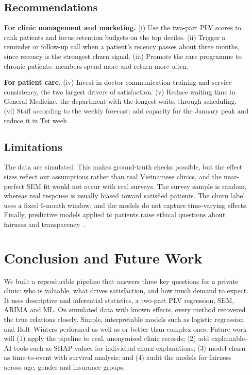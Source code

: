 \documentclass[conference]{IEEEtran}
\begin{document}
\subsection{Recommendations}
\textbf{For clinic management and marketing.} (i) Use the two-part PLV scores to rank patients and focus retention budgets on the top deciles. (ii) Trigger a reminder or follow-up call when a patient's recency passes about three months, since recency is the strongest churn signal. (iii) Promote the care programme to chronic patients: members spend more and return more often.

\textbf{For patient care.} (iv) Invest in doctor communication training and service consistency, the two largest drivers of satisfaction. (v) Reduce waiting time in General Medicine, the department with the longest waits, through scheduling. (vi) Staff according to the weekly forecast: add capacity for the January peak and reduce it in Tet week.

\subsection{Limitations}
The data are simulated. This makes ground-truth checks possible, but the effect sizes reflect our assumptions rather than real Vietnamese clinics, and the near-perfect SEM fit would not occur with real surveys. The survey sample is random, whereas real response is usually biased toward satisfied patients. The churn label uses a fixed 6-month window, and the models do not capture time-varying effects. Finally, predictive models applied to patients raise ethical questions about fairness and transparency~\cite{rajkomar2019}.

\section{Conclusion and Future Work}\label{sec:conclusion}
We built a reproducible pipeline that answers three key questions for a private clinic: who is valuable, what drives satisfaction, and how much demand to expect. It uses descriptive and inferential statistics, a two-part PLV regression, SEM, ARIMA and ML. On simulated data with known effects, every method recovered the true relations closely. Simple, interpretable models such as logistic regression and Holt--Winters performed as well as or better than complex ones. Future work will (1) apply the pipeline to real, anonymised clinic records; (2) add explainable-AI tools such as SHAP values for individual churn explanations; (3) model churn as time-to-event with survival analysis; and (4) audit the models for fairness across age, gender and insurance groups.
\end{document}

